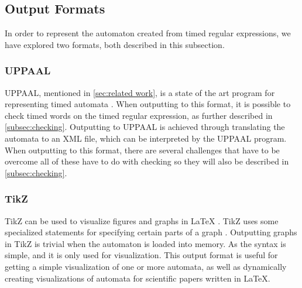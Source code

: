 \subsection{Output Formats}\label{subsec:formats}

In order to represent the automaton created from timed regular expressions, we have explored two formats, both described in this subsection.

\subsubsection{UPPAAL}
UPPAAL, mentioned in \cref{sec:related work}, is a state of the art program for representing timed automata \cite{UPPAAL}. 
When outputting to this format, it is possible to check timed words on the timed regular expression, as further described in \cref{subsec:checking}.
Outputting to UPPAAL is achieved through translating the automata to an XML file, which can be interpreted by the UPPAAL program.
When outputting to this format, there are several challenges that have to be overcome all of these have to do with checking so they will also be described in \cref{subsec:checking}.

\subsubsection{TikZ}
TikZ can be used to visualize figures and graphs in LaTeX . TikZ uses some specialized statements for specifying certain parts of a graph \cite{Tikz}.
Outputting graphs in TikZ is trivial when the automaton is loaded into memory. As the syntax is simple, and it is only used for visualization.
This output format is useful for getting a simple visualization of one or more automata, as well as dynamically creating visualizations of automata for scientific papers written in LaTeX.
